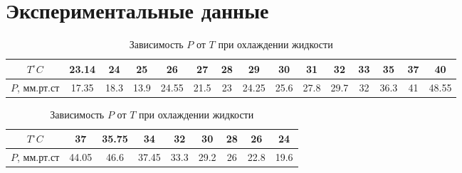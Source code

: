 \section*{Экспериментальные данные}

\begin{table}[h!]
    \centering
    \begin{tabular}{|c|c|c|c|c|c|c|c|c|c|c|c|c|c|c|}
        \hline
        $T^\circ C$ & 23.14 & 24 & 25 & 26 & 27 & 28 & 29 & 30 & 31 & 32 & 33 & 35 & 37 & 40 \\\hline
        $P$, мм.рт.ст & 17.35 & 18.3 & 13.9 & 24.55 & 21.5  & 23 & 24.25 & 25.6 & 27.8 &
        29.7 & 32 & 36.3 &  41 & 48.55\\\hline 
    \end{tabular}
    \caption{Зависимость $P$ от $T$ при нагревании жидкости}
    \vfill 
    \begin{tabular}{|c|c|c|c|c|c|c|c|c|}
        \hline
        $T^\circ C$ & 37 & 35.75 & 34 & 32 & 30 & 28 & 26 & 24\\\hline
        $P$, мм.рт.ст & 44.05 & 46.6 & 37.45 & 33.3 & 29.2 & 26 & 22.8 & 19.6\\\hline
    \end{tabular}
    \caption{Зависимость $P$ от $T$ при охлаждении жидкости}
\end{table}

